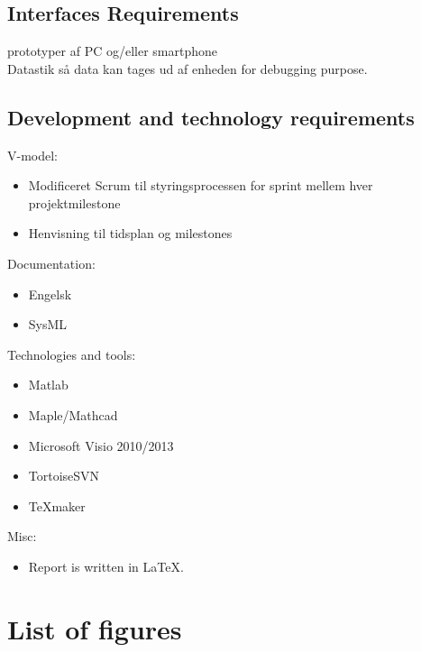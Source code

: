 \subsection{Interfaces Requirements}
prototyper af PC og/eller smartphone\\
Datastik så data kan tages ud af enheden for debugging purpose.\\

\subsection{Development and technology requirements }
V-model:\\
\begin{itemize}
\item Modificeret Scrum til styringsprocessen for sprint mellem hver projektmilestone
\item Henvisning til tidsplan og milestones
\end{itemize}

Documentation:\\
\begin{itemize}
\item Engelsk
\item SysML
\end{itemize}

Technologies and tools:\\
\begin{itemize}
\item Matlab
\item Maple/Mathcad
\item Microsoft Visio 2010/2013
\item TortoiseSVN
\item TeXmaker
\end{itemize}

Misc:\\
\begin{itemize}
\item Report is written in LaTeX.
\end{itemize}
\section{List of figures}